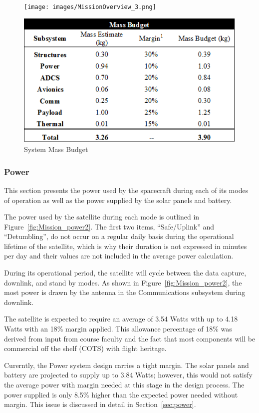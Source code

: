 \documentclass[12pt]{article}
\begin{document}
			\begin{figure}[!ht]
				\centering
				\texttt{[image: images/MissionOverview\_3.png]}

				\includegraphics[width=5in]{images/MissionOverview_5.png}
				\caption{System Mass Budget}
				\label{fig:Mission_mass2}
			\end{figure}

		\subsubsection{Power}
		This section presents the power used by the spacecraft during each of its modes of operation as well as the power supplied by the solar panels and battery. 

The power used by the satellite during each mode is outlined in Figure~\ref{fig:Mission_power2}. The first two items, ``Safe/Uplink'' and ``Detumbling'', do not occur on a regular daily basis during the operational lifetime of the satellite, which is why their duration is not expressed in minutes per day and their values are not included in the average power calculation. 

During its operational period, the satellite will cycle between the data capture, downlink, and stand by modes. As shown in Figure~\ref{fig:Mission_power2}, the most power is drawn by the antenna in the Communications subsystem during downlink. 

The satellite is expected to require an average of 3.54 Watts with up to 4.18 Watts with an 18\% margin applied. This allowance percentage of 18\% was derived from input from course faculty and the fact that most components will be commercial off the shelf (COTS) with flight heritage. 

Curerntly, the Power system design carries a tight margin. The solar panels and battery are projected to supply up to 3.84 Watts; however, this would not satisfy the average power with margin needed at this stage in the design process. The power supplied is only 8.5\% higher than the expected power needed without margin. This issue is discussed in detail in Section~\ref{sec:power}.
\end{document}
